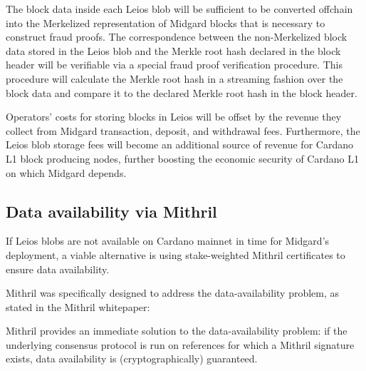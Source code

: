 \documentclass[../midgard.tex]{subfiles}
\begin{document}
The block data inside each Leios blob will be sufficient to be converted offchain into the Merkelized representation of Midgard blocks that is necessary to construct fraud proofs.
The correspondence between the non-Merkelized block data stored in the Leios blob and the Merkle root hash declared in the block header will be verifiable via a special fraud proof verification procedure.
This procedure will calculate the Merkle root hash in a streaming fashion over the block data and compare it to the declared Merkle root hash in the block header.


Operators' costs for storing blocks in Leios will be offset by the revenue they collect from Midgard transaction, deposit, and withdrawal fees.
Furthermore, the Leios blob storage fees will become an additional source of revenue for Cardano L1 block producing nodes, further boosting the economic security of Cardano L1 on which Midgard depends.

\subsection{Data availability via Mithril}
\label{h:data-availability-multisig}

If Leios blobs are not available on Cardano mainnet in time for Midgard's deployment, a viable alternative is using stake-weighted Mithril certificates to ensure data availability.

Mithril was specifically designed to address the data-availability problem, as stated in the Mithril whitepaper:
\begin{quotePretty}
Mithril provides an immediate solution to the data-availability problem: if the underlying consensus protocol is run on references for which a Mithril signature exists, data availability is (cryptographically) guaranteed.
\end{quotePretty}
\end{document}
